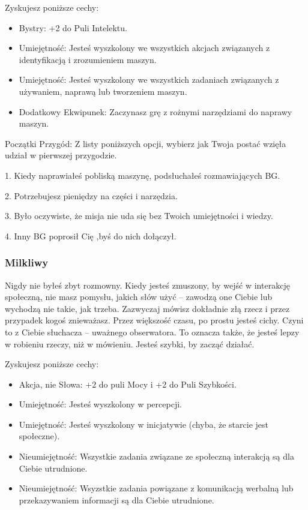 Zyskujesz poniższe cechy:
\begin{itemize}
\item Bystry: +2 do Puli Intelektu.
\item Umiejętność: Jesteś wyszkolony we wszystkich akcjach związanych z identyfikacją i zrozumieniem maszyn.
\item Umiejętność: Jesteś wyszkolony we wszystkich zadaniach związanych z używaniem, naprawą lub tworzeniem maszyn.
\item  Dodatkowy Ekwipunek: Zaczynasz grę z rożnymi narzędziami do naprawy maszyn.
\end{itemize}    
    
Początki Przygód: Z listy poniższych opcji, wybierz jak Twoja postać wzięła udział w pierwszej przygodzie.

1. Kiedy naprawiałeś pobliską maszynę, podsłuchałeś rozmawiających BG.

2. Potrzebujesz pieniędzy na części i narzędzia.

3. Było oczywiste, że misja nie uda się bez Twoich umiejętności i wiedzy.

4. Inny BG poprosił Cię ,byś do nich dołączył.

\subsubsection{Milkliwy}

Nigdy nie byłeś zbyt rozmowny. Kiedy jesteś zmuszony, by wejść w interakcję społeczną, nie masz pomysłu, jakich słów użyć – zawodzą one Ciebie lub wychodzą nie takie, jak trzeba. Zazwyczaj mówisz dokładnie złą rzecz i przez przypadek kogoś znieważasz. Przez większość czasu, po prostu jesteś cichy. Czyni to z Ciebie słuchacza – uważnego obserwatora. To oznacza także, że jesteś lepzy w robieniu rzeczy, niż w mówieniu. Jesteś szybki, by zacząć działać.

Zyskujesz poniższe cechy:
\begin{itemize}
\item Akcja, nie Słowa: +2 do puli Mocy i +2 do Puli Szybkości.
\item Umiejętność: Jesteś wyszkolony w percepcji.
\item  Umiejętność: Jesteś wyszkolony w inicjatywie (chyba, że starcie jest społeczne).
\item  Nieumiejętność: Wszystkie zadania związane ze społeczną interakcją są dla Ciebie utrudnione.
\item  Nieumiejętność: Wsyzstkie zadania powiązane z komunikacją werbalną lub przekazywaniem informacji są dla Ciebie utrudnione.
\end{itemize}

